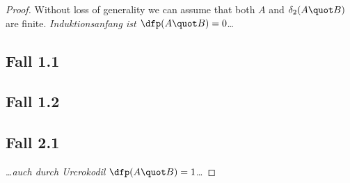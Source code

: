 \documentclass[a4paper,11pt,german,english]{article}
\begin{document}
\begin{proof}
\noindent
Without loss of generality we can assume that both $A$ and $\delta_{2}(A\quot B)$ are finite.
\emph{Induktionsanfang ist $\dfp(A\quot B)=0$}\dots
\subsection*{Fall 1.{}1}
\subsection*{Fall 1.{}2}

\bigskip
\subsection*{Fall 2.{}1}
\dots\emph{auch durch Urcrokodil} $\dfp(A\quot B)=1$\dots






\end{proof}
\end{document}
